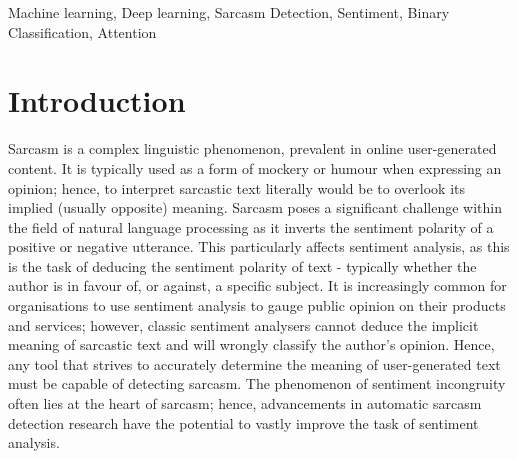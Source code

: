 \documentclass[12pt,a4paper]{article}
\begin{document}
\begin{keywords}
Machine learning, Deep learning, Sarcasm Detection, Sentiment, Binary Classification, Attention
\end{keywords}


\section{Introduction}
\noindent Sarcasm is a complex linguistic phenomenon, prevalent in online user-generated content. It is typically used as a form of mockery or humour when expressing an opinion; hence, to interpret sarcastic text literally would be to overlook its implied (usually opposite) meaning. Sarcasm poses a significant challenge within the field of natural language processing as it inverts the sentiment polarity of a positive or negative utterance. This particularly affects sentiment analysis, as this is the task of deducing the sentiment polarity of text - typically whether the author is in favour of, or against, a specific subject. It is increasingly common for organisations to use sentiment analysis to gauge public opinion on their products and services; however, classic sentiment analysers cannot deduce the implicit meaning of sarcastic text and will wrongly classify the author's opinion. Hence, any tool that strives to accurately determine the meaning of user-generated text must be capable of detecting sarcasm. The phenomenon of sentiment incongruity often lies at the heart of sarcasm; hence, advancements in automatic sarcasm detection research have the potential to vastly improve the task of sentiment analysis.\\

\end{document}
